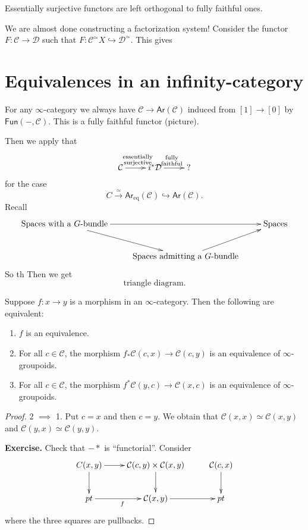 \begin{lemma}
\label{lemma-essentially-surjective-orthogonal}
Essentially surjective functors are left orthogonal to fully faithful ones.
\end{lemma}

\medskip\noindent
We are almost done constructing a factorization system!
Consider the functor  $F:\mathcal{C} \to \mathcal{D}$ such that
$F:\mathcal{C}^\simeq X \hookrightarrow \mathcal{D}^\simeq.$
This gives

\section{Equivalences in an infinity-category}
\label{section-equivalences}

For any $\infty$-category we always have
$\mathcal{C} \to \mathsf{Ar}(\mathcal{C})$ induced
from $[1] \to [0]$ by $\mathsf{Fun}(-,\mathcal{C})$.
This is a fully faithful functor (picture).

Then we apply that
$$
\xymatrix{
\mathcal{C}\ar[r]^{\substack{\text{essentially} \\ \text{surjective}}}&
i^*\mathcal{D}\ar[r]^{\substack{\text{fully}\\ \text{faithful}}} & ?
}
$$
for the case
$$
C\xrightarrow{\simeq}\mathsf{Ar}_{\text{eq}}(\mathcal{C})
\hookrightarrow \mathsf{Ar}(\mathcal{C}).
$$
Recall
$$
\xymatrix{
\text{Spaces with a $G$-bundle} \ar[rd] \ar[rr] && \text{Spaces} \\
& \text{Spaces admitting a $G$-bundle}\ar[ur]
}
$$
So th
Then we get 
$$
\text{triangle diagram}.
$$
\begin{lemma}
\label{lemma-equivalence-equivalences}
Suppose $f: x \to y$ is a morphism in an $\infty$-category.
Then the following are equivalent:

\begin{enumerate}
\item $f$ is an equivalence.
\label{item-equiv1}
\item
\label{item-equiv2}
For all $c \in \mathcal{C}$, the morphism
$f_*\mathcal{C}(c,x) \to \mathcal{C}(c,y)$ is
an equivalence of $\infty$-groupoids.
\item 
\label{item-equiv3}
For all $c \in \mathcal{C}$, the morphism
$f^*\mathcal{C}(y,c)\to \mathcal{C}(x,c)$ 
is an equivalence of $\infty$-groupoids.
\end{enumerate}
\end{lemma}

\begin{proof}
2 $\implies$ 1. Put $c=x$ and then $c=y$. We obtain that
$\mathcal{C}(x,x) \simeq \mathcal{C}(x,y)$
and $\mathcal{C}(y,x) \simeq \mathcal{C}(y,y)$.

{\bf Exercise.} Check that $- *$ is ``functorial''.
Consider
$$
\xymatrix{
C(x,y)\ar[r]\ar[d]&\mathcal{C}(c,y)\times \mathcal{C}(x,y)\ar[d]&
\mathcal{C}(c,x)\ar[d]\\
pt\ar[r]_{f}&\mathcal{C}(x,y)\ar[r]&pt
}
$$
where the three squares are pullbacks.
\end{proof}

